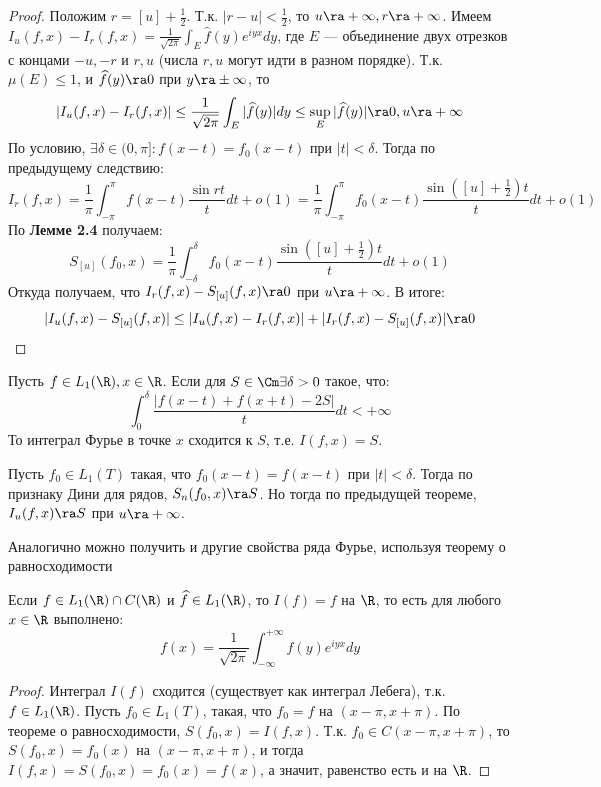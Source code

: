 \begin{proof}
    Положим \(r = [u] + \frac{1}{2}\). Т.к. \(|r - u| < \frac{1}{2}\), то \(u \ra +\infty, r \ra +\infty\). Имеем \(I_u(f, x) - I_r(f, x) = \frac{1}{\sqrt{2\pi}}\int_E \widehat{f}(y)e^{iyx}dy\), где \(E\) --- объединение двух отрезков с концами \(-u, -r\) и \(r, u\) (числа \(r, u\) могут идти в разном порядке). Т.к. \(\mu(E) \le 1\), и \(\widehat{f}(y) \ra 0\) при \(y \ra \pm\infty\), то 
    \[|I_u(f, x) - I_r(f, x)| \le \frac{1}{\sqrt{2\pi}} \int_E|\widehat{f}(y)|dy \le \sup_{E} |\widehat{f}(y)| \ra 0, u \ra +\infty\]
    По условию, \(\exists \delta \in (0, \pi]: f(x - t) = f_0(x - t)\) при \(|t| < \delta\). Тогда по предыдущему следствию:
    \[I_r(f, x) = \frac{1}{\pi}\int_{-\pi}^\pi f(x - t)\frac{\sin rt}{t}dt + o(1) = \frac{1}{\pi}\int_{-\pi}^\pi f_0(x - t) \frac{\sin\left( [u] + \frac{1}{2} \right)t}{t}dt + o(1)\]
    По \textbf{Лемме 2.4} получаем:
    \[S_{[u]}(f_0, x) = \frac{1}{\pi}\int_{-\delta}^{\delta} f_0(x - t)\frac{\sin\left( [u] + \frac{1}{2} \right)t}{t}dt + o(1)\]
    Откуда получаем, что \(I_r(f, x) - S_{[u]}(f, x) \ra 0\) при \(u \ra +\infty\). В итоге:
    \[|I_u(f, x) - S_{[u]}(f, x)| \le |I_u(f, x) - I_r(f, x)| + |I_r(f, x) - S_{[u]}(f, x)| \ra 0\]
\end{proof}

\begin{corollary}
    Пусть \(f \in L_1(\R), x \in \R\). Если для \(S \in \Cm \exists \delta > 0\) такое, что:
    \[\int_0^\delta \frac{|f(x - t) + f(x + t) - 2S|}{t}dt < +\infty\]
    То интеграл Фурье в точке \(x\) сходится к \(S\), т.е. \(I(f, x) = S\).
\end{corollary}
\begin{corollary}
    Пусть \(f_0 \in L_1(T)\) такая, что \(f_0(x - t) = f(x - t)\) при \(|t| < \delta\). Тогда по признаку Дини для рядов, \(S_n(f_0, x) \ra S\). Но тогда по предыдущей теореме, \(I_u(f, x) \ra S\) при \(u \ra +\infty\).
\end{corollary}

\begin{note}
    Аналогично можно получить и другие свойства ряда Фурье, используя теорему о равносходимости
\end{note}

\begin{corollary}
    Если \(f \in L_1(\R) \cap C(\R)\) и \(\widehat{f} \in L_1(\R)\), то \(I(f) = f\) на \(\R\), то есть для любого \(x \in \R\) выполнено:
    \[f(x) = \frac{1}{\sqrt{2\pi}}\int_{-\infty}^{+\infty}\widehat{f}(y)e^{iyx}dy\]
\end{corollary}
\begin{proof}
    Интеграл \(I(f)\) сходится (существует как интеграл Лебега), т.к. \(f \in L_1(\R)\). Пусть \(f_0 \in L_1(T)\), такая, что \(f_0 = f\) на \((x - \pi, x + \pi)\). По теореме о равносходимости, \(S(f_0, x) = I(f, x)\). Т.к. \(f_0 \in C(x - \pi, x + \pi)\), то \(S(f_0, x) = f_0(x)\) на \((x - \pi, x + \pi)\), и тогда \(I(f, x) = S(f_0, x) = f_0(x) = f(x)\), а значит, равенство есть и на \(\R\).
\end{proof}

